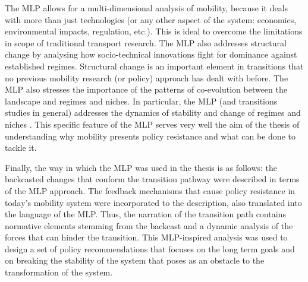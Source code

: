 The MLP allows for a multi-dimensional analysis of mobility, because it deals with more than just technologies (or any other aspect of the system: economics, environmental impacts, regulation, etc.). This is ideal to overcome the limitations in scope of traditional transport research. The MLP also addresses structural change by analysing how socio-technical innovations fight for dominance against established regimes. Structural change is an important element in transitions that no previous mobility research (or policy) approach has dealt with before. The MLP also stresses the importance of the patterns of co-evolution between the landscape and regimes and niches. In particular, the MLP (and transitions studies in general) addresses the dynamics of stability and change of regimes and niches \parencite{geels2011_multilevelperspective}. This specific feature of the MLP serves very well the aim of the thesis of understanding why mobility presents policy resistance and what can be done to tackle it.

Finally, the way in which the MLP was used in the thesis is as follows: the backcasted changes that conform the transition pathway were described in terms of the MLP approach. The feedback mechanisms that cause policy resistance in today's mobility system were incorporated to the description, also translated into the language of the MLP. Thus, the narration of the transition path contains normative elements stemming from the backcast and a dynamic analysis of the forces that can hinder the transition. This MLP-inspired analysis was used to design a set of policy recommendations that focuses on the long term goals and on breaking the stability of the system that poses as an obstacle to the transformation of the system.